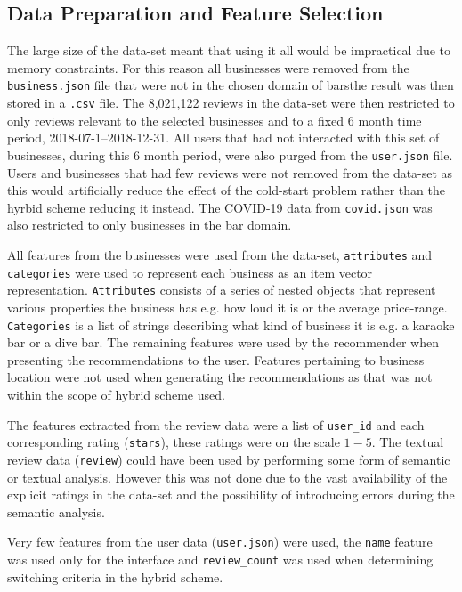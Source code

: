 \documentclass[conference]{IEEEtran}
\begin{document}
\subsection{Data Preparation and Feature Selection}
The large size of the data-set meant that using it all would be impractical due to memory constraints. For this reason all businesses were removed from the \texttt{business.json} file that were not in the chosen domain of bars\textemdash the result was then stored in a \texttt{.csv} file. The 8,021,122 reviews in the data-set were then restricted to only reviews relevant to the selected businesses and to a fixed 6 month time period, 2018-07-1--2018-12-31. All users that had not interacted with this set of businesses, during this 6 month period, were also purged from the \texttt{user.json} file. Users and businesses that had few reviews were not removed from the data-set as this would artificially reduce the effect of the cold-start problem rather than the hyrbid scheme reducing it instead. The COVID-19 data from \texttt{covid.json} was also restricted to only businesses in the bar domain.
\par
All features from the businesses were used from the data-set, \texttt{attributes} and \texttt{categories} were used to represent each business as an item vector representation. \texttt{Attributes} consists of a series of nested objects that represent various properties the business has e.g. how loud it is or the average price-range. \texttt{Categories} is a list of strings describing what kind of business it is e.g. a karaoke bar or a dive bar. The remaining features were used by the recommender when presenting the recommendations to the user. Features pertaining to business location were not used when generating the recommendations as that was not within the scope of hybrid scheme used.
\par
The features extracted from the review data were a list of \texttt{user\_id} and each corresponding rating (\texttt{stars}), these ratings were on the scale $1-5$. The textual review data (\texttt{review}) could have been used by performing some form of semantic or textual analysis\cite{b10}. However this was not done due to the vast availability of the explicit ratings in the data-set and the possibility of introducing errors during the semantic analysis\cite{b11}.
\par
Very few features from the user data (\texttt{user.json}) were used, the \texttt{name} feature was used only for the interface and \texttt{review\_count} was used when determining switching criteria in the hybrid scheme.
\end{document}
